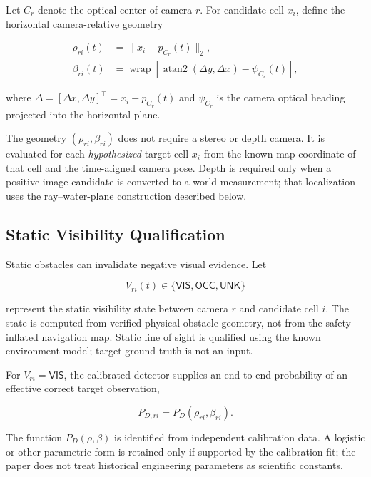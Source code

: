 \documentclass[conference]{IEEEtran}
\begin{document}
Let $C_r$ denote the optical center of camera $r$. For candidate cell $x_i$,
define the horizontal camera-relative geometry

\begin{equation}
\begin{aligned}
\rho_{ri}(t)&=\|x_i-p_{C_r}(t)\|_2,\\
\beta_{ri}(t)&=
\operatorname{wrap}\!\left[
\operatorname{atan2}(\Delta y,\Delta x)-\psi_{C_r}(t)
\right],
\end{aligned}
\label{eq:camera_geometry}
\end{equation}

where $\Delta=[\Delta x,\Delta y]^\top=x_i-p_{C_r}(t)$ and $\psi_{C_r}$ is the
camera optical heading projected into the horizontal plane.


The geometry $(\rho_{ri},\beta_{ri})$ does not require a stereo or depth
camera. It is evaluated for each \emph{hypothesized} target cell $x_i$ from
the known map coordinate of that cell and the time-aligned camera pose. Depth
is required only when a positive image candidate is converted to a world
measurement; that localization uses the ray--water-plane construction
described below.

\subsection{Static Visibility Qualification}

Static obstacles can invalidate negative visual evidence. Let

\begin{equation}
V_{ri}(t)\in\{\mathsf{VIS},\mathsf{OCC},\mathsf{UNK}\}
\label{eq:visibility_state}
\end{equation}

represent the static visibility state between camera $r$ and candidate cell
$i$. The state is computed from verified physical obstacle geometry, not from
the safety-inflated navigation map. Static line of sight is qualified using the
known environment model; target ground truth is not an input.

For $V_{ri}=\mathsf{VIS}$, the calibrated detector supplies an end-to-end
probability of an effective correct target observation,

\begin{equation}
P_{D,ri}=P_D(\rho_{ri},\beta_{ri}).
\label{eq:pd_generic}
\end{equation}

The function $P_D(\rho,\beta)$ is identified from independent calibration data.
A logistic or other parametric form is retained only if supported by the
calibration fit; the paper does not treat historical engineering parameters as
scientific constants.
\end{document}
